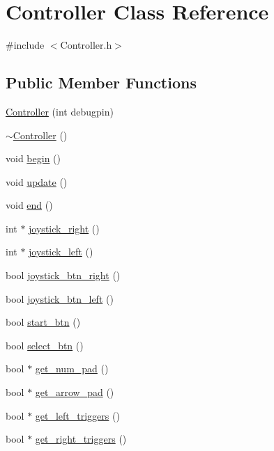 \hypertarget{class_controller}{}\section{Controller Class Reference}
\label{class_controller}


{\ttfamily \#include $<$Controller.\+h$>$}

\subsection*{Public Member Functions}
\begin{DoxyCompactItemize}
\item 
\hyperlink{class_controller_aab64b54728b3f5d68bd2320605bdc51d}{Controller} (int debugpin)
\item 
\hyperlink{class_controller_a0ab87934c4f7a266cfdb86e0f36bc1b5}{$\sim$\+Controller} ()
\item 
void \hyperlink{class_controller_a1cc0b87ab9e07d21ab47d294aa5bf607}{begin} ()
\item 
void \hyperlink{class_controller_a7d04c17913f04f99429aa29fa8505484}{update} ()
\item 
void \hyperlink{class_controller_aaa374c56ef024a31888ab048baf0219c}{end} ()
\item 
int $\ast$ \hyperlink{class_controller_a1f02ff9e9853dd53232df37f6676b0dc}{joystick\+\_\+right} ()
\item 
int $\ast$ \hyperlink{class_controller_a2d21a10299aaacdcdb571b10f6436270}{joystick\+\_\+left} ()
\item 
bool \hyperlink{class_controller_a3710226224d7d95b1495bcac853abbe8}{joystick\+\_\+btn\+\_\+right} ()
\item 
bool \hyperlink{class_controller_a0bd70e25e112c655ba578f147af9ce11}{joystick\+\_\+btn\+\_\+left} ()
\item 
bool \hyperlink{class_controller_acde5cc2b40d1cc9e451a704ec1811b53}{start\+\_\+btn} ()
\item 
bool \hyperlink{class_controller_aa94980f9d72b8b3d61f05641e82710ba}{select\+\_\+btn} ()
\item 
bool $\ast$ \hyperlink{class_controller_a590216b5d6e1fc904c62e8ed213c2767}{get\+\_\+num\+\_\+pad} ()
\item 
bool $\ast$ \hyperlink{class_controller_a4162841dc8e34bffaff972c725f162cc}{get\+\_\+arrow\+\_\+pad} ()
\item 
bool $\ast$ \hyperlink{class_controller_abeab6704d15e871e16beaf2c82d8c1f2}{get\+\_\+left\+\_\+triggers} ()
\item 
bool $\ast$ \hyperlink{class_controller_a074d3c80ec11e8e64a7d5d0bb7ff06db}{get\+\_\+right\+\_\+triggers} ()
\end{DoxyCompactItemize}


